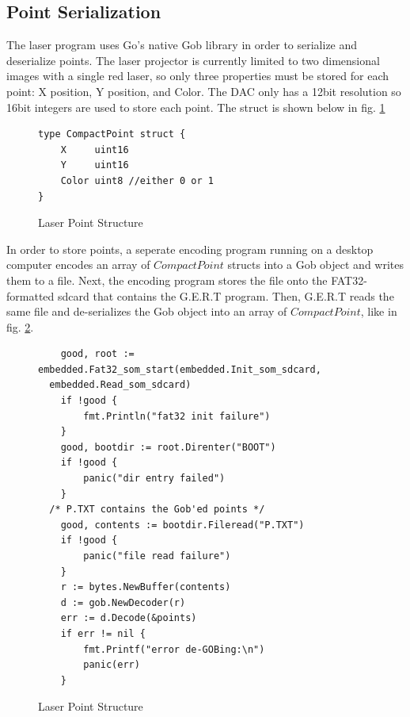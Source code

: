 \subsection{Point Serialization}
The laser program uses Go's native Gob library in order to serialize and
deserialize points. The laser projector is currently limited to
two dimensional images with a single red laser, so only three
properties must be stored for each point: X position, Y position,
and Color. The DAC only has a 12bit resolution so 16bit integers are used
to store each point. The struct is shown below in fig. \ref{fig:cpoint}

\begin{figure}[!h]
\begin{center}
\begin{lstlisting}
type CompactPoint struct {
	X     uint16
	Y     uint16
	Color uint8 //either 0 or 1
}
\end{lstlisting}
\end{center}
  \caption{Laser Point Structure} \label{fig:cpoint}
\end{figure}

In order to store points, a seperate encoding program running
on a desktop computer encodes an array of $CompactPoint$ structs into
a Gob object and writes them to a file. Next, the encoding program stores
the file onto the FAT32-formatted sdcard that contains the G.E.R.T
program. Then, G.E.R.T reads the same file and de-serializes the Gob object
into an array of $CompactPoint$, like in fig. \ref{fig:loadpoints}.

\begin{figure}[!h]
\begin{center}
\begin{lstlisting}
	good, root := embedded.Fat32_som_start(embedded.Init_som_sdcard,
  embedded.Read_som_sdcard)
	if !good {
		fmt.Println("fat32 init failure")
	}
	good, bootdir := root.Direnter("BOOT")
	if !good {
		panic("dir entry failed")
	}
  /* P.TXT contains the Gob'ed points */
	good, contents := bootdir.Fileread("P.TXT")
	if !good {
		panic("file read failure")
	}
	r := bytes.NewBuffer(contents)
	d := gob.NewDecoder(r)
	err := d.Decode(&points)
	if err != nil {
		fmt.Printf("error de-GOBing:\n")
		panic(err)
	}
\end{lstlisting}
\end{center}
  \caption{Laser Point Structure} \label{fig:loadpoints}
\end{figure}


